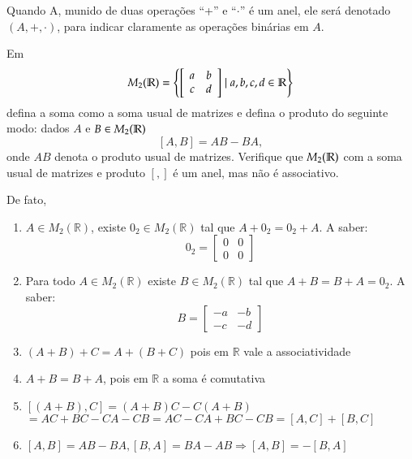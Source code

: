 Quando A, munido de duas opera{\c c}{\~o}es ``+'' e ``$\cdot$'' {\'e} um anel, ele ser{\'a} denotado $(A,+,\cdot)$, para indicar claramente as opera{\c c}{\~o}es bin{\'a}rias em $A$.

\begin{exemplo}
	Em
	\[
		M_{2}(\mathbb{R}) = \left\{\left[\begin{array}{cc}
		a & b\\
		c & d
		\end{array}\right]\mid a, b, c, d \in \mathbb{R}\right\}
	\]
	defina a soma como a soma usual de matrizes e defina o produto do seguinte modo: dados $A$ e $B\in M_{2}(\mathbb{R})$
	\[
		[A, B] = AB - BA,
	\]
	onde $AB$ denota o produto usual de matrizes. Verifique que $M_{2}(\mathbb{R})$ com a soma usual de matrizes e produto $[,]$ {\'e} um anel, mas n{\~a}o {\'e} associativo.
	\begin{solucao}
		De fato,
		\begin{enumerate}
		\item $A\in M_{2}(\mathbb{R})$, existe $0_{2}\in M_{2}(\mathbb{R})$ tal que $A+0_{2}=0_{2}+A$. A saber:\\
		\[0_{2}=\left[\begin{array}{cc}
		0 & 0\\
		0 & 0
		\end{array}\right]\]
		
		\item Para todo $A\in M_{2}(\mathbb{R})$ existe $B\in M_{2}(\mathbb{R})$ tal que $A+B=B+A=0_{2}$. A saber:\\
		\[B=\left[\begin{array}{cc}
	     -a & -b\\
	    -c & -d
		\end{array}\right]\]
		
		\item $(A+B)+C=A+(B+C)$ pois em $\mathbb{R}$ vale a associatividade
		
		\item $A+B=B+A$, pois em $\mathbb{R}$ a soma {\'e} comutativa
		
		\item $[(A+B),C]=(A+B)C-C(A+B)$\\
		$=AC+BC-CA-CB=AC-CA+BC-CB=[A,C]+[B,C]$
		
		\item $[A,B]=AB-BA, [B,A]=BA-AB \Rightarrow [A,B]=-[B,A]$
\end{enumerate}
	\end{solucao}
\end{exemplo}


